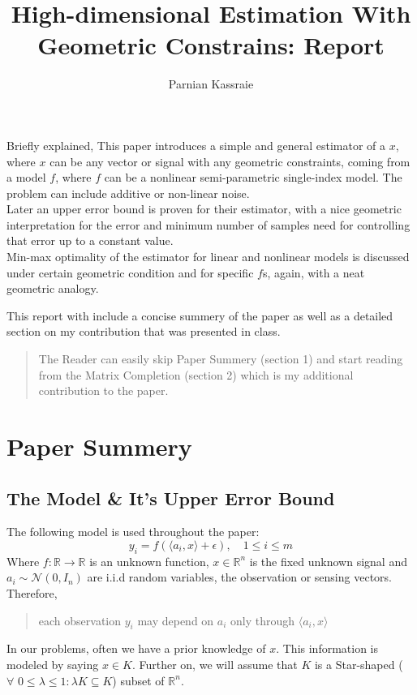 \documentclass{amsart}
\theoremstyle{definition}
\theoremstyle{remark}
\numberwithin{equation}{section}
\begin{document}
\title{High-dimensional Estimation With Geometric Constrains: Report}

\author{Parnian Kassraie}
\address{Compressed Sensing, Sharif University of Technology, Spring 2018}


\maketitle

Briefly explained, This paper introduces a simple and general estimator of a $x$, where $x$ can be any vector or signal with any geometric constraints, coming from a model $f$, where $f$ can be a nonlinear semi-parametric single-index model. The problem can include additive or non-linear noise.\\
Later an upper error bound is proven for their estimator, with a nice geometric interpretation for the error and minimum number of samples need for controlling that error up to a constant value.\\
Min-max optimality of the estimator for linear and nonlinear models is discussed under certain geometric condition and for specific $f$s, again, with a neat geometric analogy.
\par This report with include a concise summery of the paper as well as a detailed section on my contribution that was presented in class.\\
\begin{quotation}
The Reader can easily skip Paper Summery (section 1) and start reading from the Matrix Completion (section 2) which is my additional contribution to the paper.
\end{quotation}
\section{\textbf{Paper Summery}}
\subsection{The Model \& It's Upper Error Bound}
The following model is used throughout the paper:
\[
y_i = f(\langle a_i,x \rangle +\epsilon),\quad 1\leq i \leq m
\]
Where $f:\mathbb{R}\rightarrow \mathbb{R}$ is an unknown function, $x\in \mathbb{R}^n$ is the fixed unknown signal and $a_i \sim \mathcal{N}(0,I_n) $ are i.i.d random variables, the observation or sensing vectors. Therefore,
\begin{quote}
each observation $y_i$ may depend on $a_i$ only through $\langle a_i,x\rangle$
\end{quote}
In our problems, often we have a prior knowledge of $x$. This information is modeled by saying $x \in K$. Further on, we will assume that $K$ is a Star-shaped ($\forall \,\, 0\leq \lambda \leq 1: \lambda K \subseteq K$) subset of $\mathbb{R}^n$.
\end{document}

